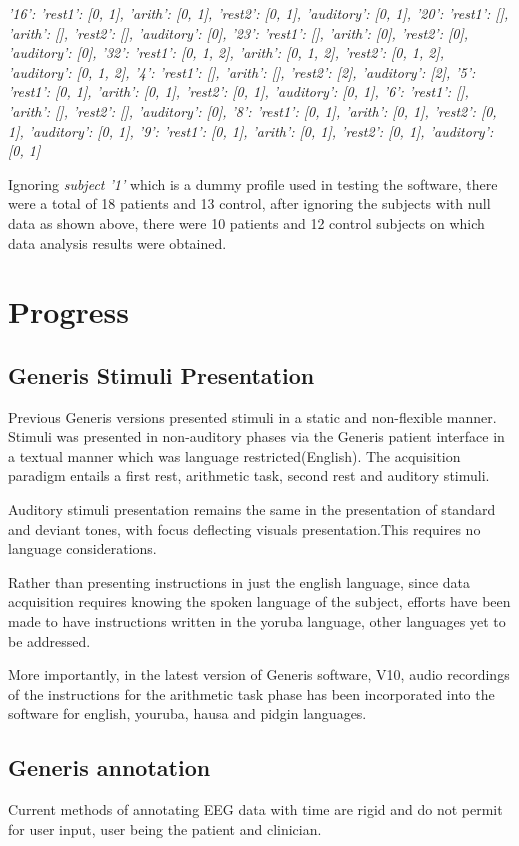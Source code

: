\documentclass[conference]{IEEEconf}
\begin{document}
\textit{
  {'16': {'rest1': [0, 1], 'arith': [0, 1], 'rest2': [0, 1], 'auditory': [0, 1]}, '20': {'rest1': [], 'arith': [], 'rest2': [], 
'auditory': [0]}, '23': {'rest1': [], 'arith': [0], 'rest2': [0], 'auditory': [0]}, '32': {'rest1': [0, 1, 2], 'arith': [0, 1, 2],
 'rest2': [0, 1, 2], 'auditory': [0, 1, 2]}, '4': {'rest1': [], 'arith': [], 'rest2': [2], 'auditory': [2]}, '5': {'rest1': [0, 1], 
 'arith': [0, 1], 'rest2': [0, 1], 'auditory': [0, 1]}, '6': {'rest1': [], 'arith': [], 'rest2': [], 'auditory': [0]}, '8': {'rest1': 
 [0, 1], 'arith': [0, 1], 'rest2': [0, 1], 'auditory': [0, 1]}, '9': {'rest1': [0, 1], 'arith': [0, 1], 'rest2': [0, 1], 'auditory': [0, 1]}}
}

Ignoring \textit{subject '1'} which is a dummy profile used in testing the software, 
there were a total of 18 patients and 13 control, after ignoring the subjects with null data 
as shown above, there were 10 patients and 12 control subjects on which data analysis results
were obtained.
            
\section{Progress}
\subsection{Generis Stimuli Presentation}
Previous Generis versions presented stimuli in a static and non-flexible manner. Stimuli was presented in non-auditory phases via the Generis patient interface in 
a textual manner which was language restricted(English). The acquisition paradigm entails a first rest, arithmetic task, second rest and auditory stimuli.

Auditory stimuli presentation remains the same in the presentation of standard and deviant tones, with focus deflecting visuals presentation.This requires no language
considerations.

Rather than presenting instructions in just the english language, since data acquisition requires knowing the spoken language of the subject, efforts have been made
to have instructions written in the yoruba language, other languages yet to be addressed.

More importantly, in the latest version of Generis software, V10, audio recordings of the instructions for the arithmetic task phase has been incorporated
into the software for english, youruba, hausa and pidgin languages.

\subsection{Generis annotation}
Current methods of annotating EEG data with time are rigid and do not permit for user input, user being the patient and clinician.
\end{document}
